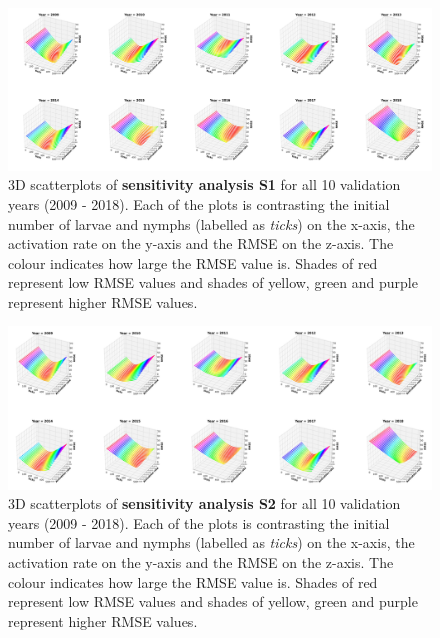 \documentclass[a4paper, 11pt]{scrartcl}
\begin{document}
\printbibliography[heading = bibintoc, title = {Bibliography}]

\clearpage

\begin{figure}
\centering
\includegraphics[width=\linewidth]{figures/S1_2009_2018_rmse}
\caption{3D scatterplots of \textbf{sensitivity analysis S1} for all 10 validation years (2009 - 2018). Each of the plots is contrasting the initial number of larvae and nymphs (labelled as \textit{ticks}) on the x-axis, the activation rate on the y-axis and the RMSE on the z-axis. The colour indicates how large the RMSE value is. Shades of red represent low RMSE values and shades of yellow, green and purple represent higher RMSE values.}
\label{fig:S1_2009_2018_rmse_rotated}
\end{figure}

\begin{figure}
\centering
\includegraphics[width=\linewidth]{figures/S2_2009_2018_rmse}
\caption{3D scatterplots of \textbf{sensitivity analysis S2} for all 10 validation years (2009 - 2018). Each of the plots is contrasting the initial number of larvae and nymphs (labelled as \textit{ticks}) on the x-axis, the activation rate on the y-axis and the RMSE on the z-axis. The colour indicates how large the RMSE value is. Shades of red represent low RMSE values and shades of yellow, green and purple represent higher RMSE values.}
\label{fig:S2_2009_2018_rmse_rotated}
\end{figure}
\end{document}
